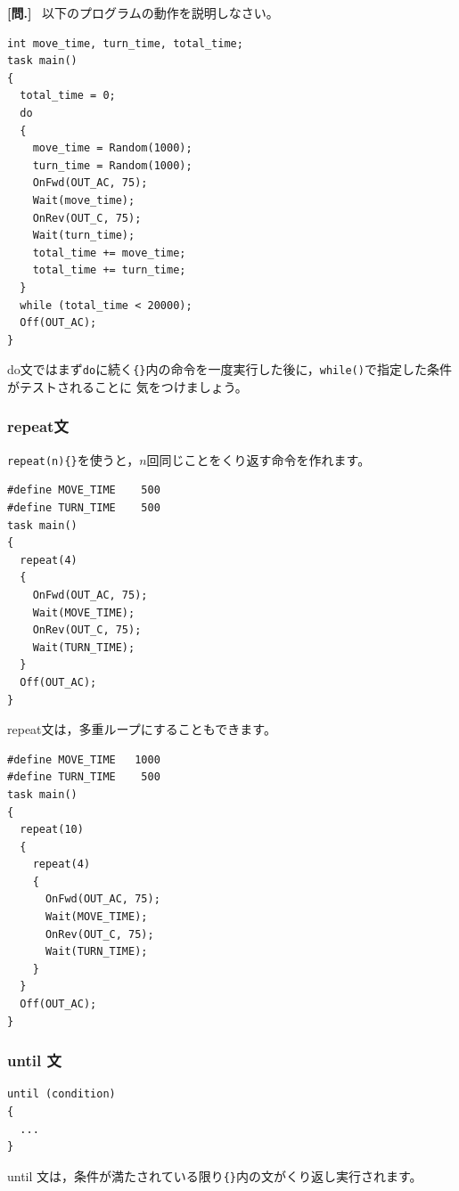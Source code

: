 \documentclass[11pt]{jarticle}
\makeatletter
\newcounter{qnum}[section]
\def\theqnum{問\thesection.\the\c@qnum}
\def\question{\refstepcounter{qnum}%
  \vspace{3mm}\noindent\textbf{[\theqnum]}~}
\makeatother
\begin{document}
\question
以下のプログラムの動作を説明しなさい。

\begin{screen}{\small
\begin{verbatim}
int move_time, turn_time, total_time; 
task main() 
{ 
  total_time = 0; 
  do 
  { 
    move_time = Random(1000); 
    turn_time = Random(1000); 
    OnFwd(OUT_AC, 75); 
    Wait(move_time); 
    OnRev(OUT_C, 75); 
    Wait(turn_time); 
    total_time += move_time; 
    total_time += turn_time; 
  } 
  while (total_time < 20000); 
  Off(OUT_AC); 
} 
\end{verbatim}}
\end{screen}
do文ではまず\verb|do|に続く\verb|{}|内の命令を一度実行した後に，\verb|while()|で指定した条件がテストされることに
気をつけましょう。




\subsubsection{repeat文}

\verb|repeat(n){}|を使うと，$n$回同じことをくり返す命令を作れます。
\begin{screen}{\small
\begin{verbatim} 
#define MOVE_TIME    500
#define TURN_TIME    500 
task main() 
{ 
  repeat(4) 
  { 
    OnFwd(OUT_AC, 75); 
    Wait(MOVE_TIME); 
    OnRev(OUT_C, 75); 
    Wait(TURN_TIME); 
  } 
  Off(OUT_AC); 
} 
\end{verbatim}}
\end{screen}

repeat文は，多重ループにすることもできます。

\begin{screen}{\small
\begin{verbatim}
#define MOVE_TIME   1000 
#define TURN_TIME    500 
task main() 
{ 
  repeat(10) 
  { 
    repeat(4) 
    { 
      OnFwd(OUT_AC, 75); 
      Wait(MOVE_TIME); 
      OnRev(OUT_C, 75); 
      Wait(TURN_TIME); 
    } 
  } 
  Off(OUT_AC); 
} 
\end{verbatim}}
\end{screen}


\subsubsection{until 文}

\begin{screen}{\small
\begin{verbatim}
until (condition)
{
  ...
}
\end{verbatim}}
\end{screen}
until 文は，条件が満たされている限り\verb|{}|内の文がくり返し実行されます。
\end{document}
